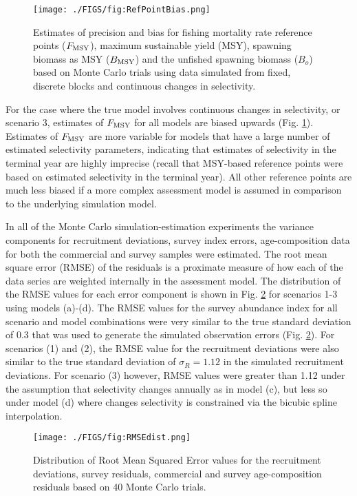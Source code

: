 \begin{figure*}[!tbh]
	\begin{center}
		\texttt{[image: ./FIGS/fig:RefPointBias.png]}
	\end{center}
	\caption{Estimates of precision and bias for fishing mortality rate reference points ($F_{\rm{MSY}}$), maximum sustainable yield (MSY), spawning biomass as MSY ($B_{\rm{MSY}}$) and the unfished spawning biomass ($B_o$) based on Monte Carlo trials using data simulated from fixed, discrete blocks and continuous changes in selectivity. }
	\label{fig:RefPointBias}
\end{figure*}

For the case where the true model involves continuous changes in selectivity, or scenario 3, estimates of $F_{\rm{MSY}}$ for all models are biased upwards (Fig. \ref{fig:RefPointBias}).  Estimates of $F_{\rm{MSY}}$ are more variable for models that have a large number of estimated selectivity parameters, indicating that estimates of selectivity in the terminal year are highly imprecise (recall that MSY-based reference points were based on estimated selectivity in the terminal year). All other reference points are much less biased if a more complex assessment model is assumed in comparison to the underlying simulation model.


In all of the Monte Carlo simulation-estimation experiments the variance components for recruitment deviations, survey index errors, age-composition data for both the commercial and survey samples were estimated.  The root mean square error (RMSE) of the residuals is a proximate measure of how each of the data series are weighted internally in the assessment model.   The distribution of the RMSE values for each error component is shown in Fig. \ref{fig:RMSEdist} for scenarios 1-3 using models (a)-(d).  The RMSE values for the survey abundance index for all scenario and model combinations were very similar to the true standard deviation of 0.3 that was used to generate the simulated observation errors (Fig. \ref{fig:RMSEdist}).   For scenarios (1) and (2), the RMSE value for the recruitment deviations were also similar to the true standard deviation of $\sigma_R=1.12$ in the simulated recruitment deviations.  For scenario (3) however, RMSE values were greater than 1.12 under the assumption that selectivity changes annually  as in model (c), but less so under model (d) where changes selectivity is constrained via the bicubic spline interpolation.

\begin{figure*}[!tbh]
	\begin{center}
		\texttt{[image: ./FIGS/fig:RMSEdist.png]}
	\end{center}
	\caption{Distribution of Root Mean Squared Error values for the recruitment deviations, survey residuals, commercial and survey age-composition residuals based on 40 Monte Carlo trials.}
	\label{fig:RMSEdist}
\end{figure*}

